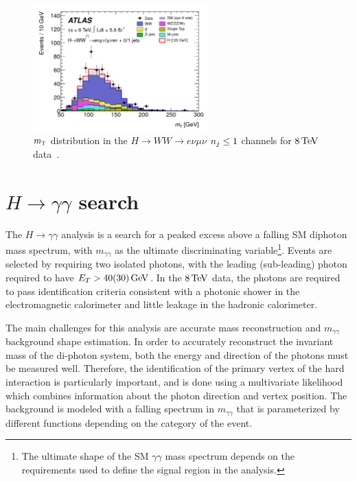 \begin{figure}[h!]
  \centering
  \captionsetup{justification=centering}
  \includegraphics[width=0.6\textwidth]{figures/discovery_mt}
  \caption{$m_{\textrm{\footnotesize\sc t}}$ distribution in the $H\to WW \to e\nu\mu\nu$ $n_j \leq 1$ channels for $8 \TeV$ data~\cite{Discovery}.}
  \label{fig:disc_mt}
\end{figure}


\section{$H\to\gamma\gamma$ search}

The $H\to\gamma\gamma$ analysis is a search for a peaked excess above a falling SM diphoton mass spectrum, with $m_{\gamma\gamma}$ as the ultimate discriminating variable\footnote{The ultimate shape of the SM $\gamma\gamma$ mass spectrum depends on the requirements used to define the signal region in the analysis.}. Events are selected by requiring two isolated photons, with the leading (sub-leading) photon required to have $E_{T} > 40 (30) \GeV$. In the $8 \TeV$ data, the photons are required to pass identification criteria consistent with a photonic shower in the electromagnetic calorimeter and little leakage in the hadronic calorimeter. 

The main challenges for this analysis are accurate mass reconstruction and $m_{\gamma\gamma}$ background shape estimation. In order to accurately reconstruct the invariant mass of the di-photon system, both the energy and direction of the photons must be measured well. Therefore, the identification of the primary vertex of the hard interaction is particularly important, and is done using a multivariate likelihood which combines information about the photon direction and vertex position. The background is modeled with a falling spectrum in $m_{\gamma\gamma}$ that is parameterized by different functions depending on the category of the event.

